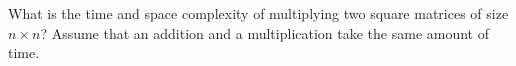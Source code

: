   What is the time and space complexity of multiplying two square
  matrices of size $n\times n$? Assume that an addition and a
  multiplication take the same amount of time.
